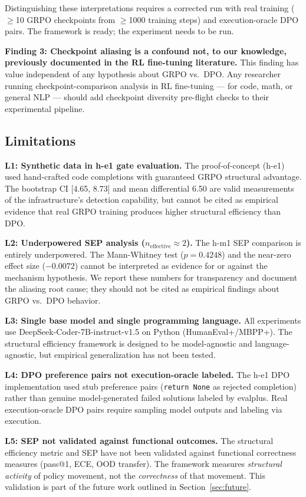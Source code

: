 Distinguishing these interpretations requires a corrected run with real training
($\geq$10 GRPO checkpoints from $\geq$1000 training steps) and execution-oracle DPO pairs.
The framework is ready; the experiment needs to be run.

\textbf{Finding 3: Checkpoint aliasing is a confound not, to our knowledge, previously documented in the RL fine-tuning literature.}
This finding has value independent of any hypothesis about GRPO vs.\ DPO. Any
researcher running checkpoint-comparison analysis in RL fine-tuning --- for code,
math, or general NLP --- should add checkpoint diversity pre-flight checks to their
experimental pipeline.

\subsection{Limitations}
\label{sec:limitations}

\textbf{L1: Synthetic data in h-e1 gate evaluation.}
The proof-of-concept (h-e1) used hand-crafted code completions with guaranteed
GRPO structural advantage. The bootstrap CI [4.65, 8.73] and mean differential 6.50
are valid measurements of the infrastructure's detection capability, but cannot
be cited as empirical evidence that real GRPO training produces higher structural efficiency than DPO.

\textbf{L2: Underpowered SEP analysis ($n_\text{effective} \approx 2$).}
The h-m1 SEP comparison is entirely underpowered. The Mann-Whitney test
($p = 0.4248$) and the near-zero effect size ($-0.0072$) cannot be interpreted as
evidence for or against the mechanism hypothesis. We report these numbers for
transparency and document the aliasing root cause; they should not be cited as
empirical findings about GRPO vs.\ DPO behavior.

\textbf{L3: Single base model and single programming language.}
All experiments use DeepSeek-Coder-7B-instruct-v1.5 on Python (HumanEval+/MBPP+).
The structural efficiency framework is designed to be model-agnostic and
language-agnostic, but empirical generalization has not been tested.

\textbf{L4: DPO preference pairs not execution-oracle labeled.}
The h-e1 DPO implementation used stub preference pairs (\texttt{return None} as
rejected completion) rather than genuine model-generated failed solutions
labeled by evalplus. Real execution-oracle DPO pairs require sampling model
outputs and labeling via execution.

\textbf{L5: SEP not validated against functional outcomes.}
The structural efficiency metric and SEP have not been validated against functional
correctness measures (pass@1, ECE, OOD transfer). The framework measures \emph{structural activity}
of policy movement, not the \emph{correctness} of that movement. This validation is part of the future work
outlined in Section~\ref{sec:future}.

